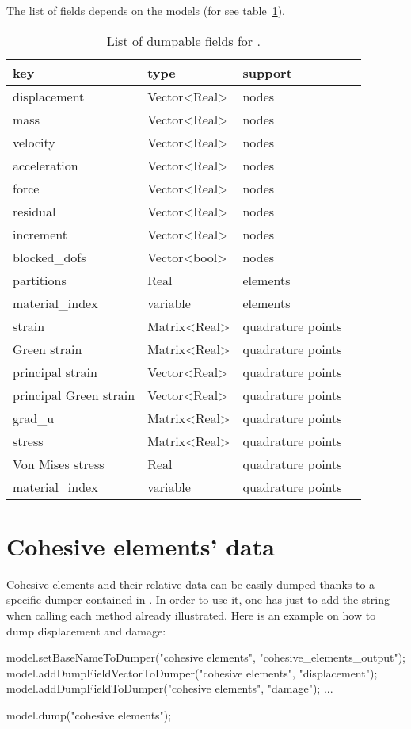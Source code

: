 The list of fields depends on the models (for
 see table~\ref{tab:io:smm_field_list}).

\begin{table}
  \centering
  \begin{tabular}{llll}
    \toprule
    key          &    type      & support \\
    \midrule
    displacement & Vector<Real> & nodes  \\
    mass         & Vector<Real> & nodes  \\
    velocity     & Vector<Real> & nodes  \\
    acceleration & Vector<Real> & nodes  \\
    force	       & Vector<Real> & nodes  \\
    residual     & Vector<Real> & nodes  \\
    increment     & Vector<Real> & nodes  \\
    {blocked\_dofs}  & Vector<bool> & nodes  \\    
    partitions   & Real         & elements \\
    material\_index & variable  & elements\\    
    strain & Matrix<Real> & quadrature points  \\
    Green strain & Matrix<Real> & quadrature points  \\
    principal strain & Vector<Real> & quadrature points  \\
    principal Green strain & Vector<Real> & quadrature points  \\
    grad\_u & Matrix<Real> & quadrature points  \\    
    stress & Matrix<Real> & quadrature points  \\
    Von Mises stress & Real & quadrature points  \\        
    material\_index & variable  & quadrature points \\
    \bottomrule
  \end{tabular}
  \caption{List of dumpable fields for .}
  \label{tab:io:smm_field_list}
\end{table}

\section{Cohesive elements' data}
Cohesive elements and their relative data can be easily dumped thanks
to a specific dumper contained in
. In order to use it, one has just
to add the string  when calling each method
already illustrated. Here is an example on how to dump displacement
and damage:
\begin{cpp}
  model.setBaseNameToDumper("cohesive elements", "cohesive_elements_output");
  model.addDumpFieldVectorToDumper("cohesive elements", "displacement");
  model.addDumpFieldToDumper("cohesive elements", "damage");
  ...

  model.dump("cohesive elements");
\end{cpp}

